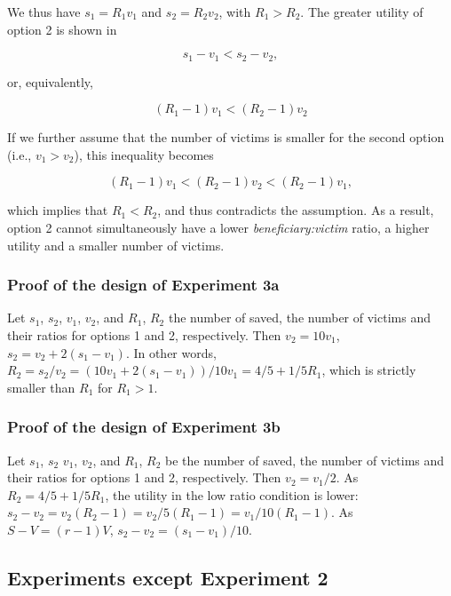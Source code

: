 \documentclass[
]{article}
\begin{document}
We thus have \(s_1 = R_1 v_1\) and \(s_2 = R_2 v_2\), with \(R_1 > R_2\). The greater utility of option 2 is shown in

\[s_1 - v_1 < s_2 - v_2,\]

or, equivalently,

\[(R_1 - 1) v_1 < (R_2 - 1) v_2\]

If we further assume that the number of victims is smaller for the second option (i.e., \(v_1 > v_2\)), this inequality becomes

\[(R_1 - 1) v_1 < (R_2 - 1) v_2 < (R_2 -1) v_1,\]

which implies that \(R_1 < R_2\), and thus contradicts the assumption. As a result, option 2 cannot simultaneously have a lower \emph{beneficiary:victim} ratio, a higher utility and a smaller number of victims.

\subsubsection{Proof of the design of Experiment 3a}\label{proof-of-the-design-of-experiment-3a}

Let \(s_1\), \(s_2\), \(v_1\), \(v_2\), and \(R_1\), \(R_2\) the number of saved, the number of victims and their ratios for options 1 and 2, respectively. Then \(v_2 = 10 v_1\), \(s_2 = v_2 +  2 (s_1 - v_1)\). In other words, \(R_2  = s_2 / v_2 = (10v_1 + 2 (s_1 - v_1)) / 10 v_1 = 4/5 + 1/5 R_1\), which is strictly smaller than \(R_1\) for \(R_1 > 1\).

\subsubsection{Proof of the design of Experiment 3b}\label{proof-of-the-design-of-experiment-3b}

Let \(s_1\), \(s_2\) \(v_1\), \(v_2\), and \(R_1\), \(R_2\) be the number of saved, the number of victims and their ratios for options 1 and 2, respectively. Then \(v_2 = v_1/2\). As \(R_2 = 4/5 + 1/5 R_1\), the utility in the low ratio condition is lower: \(s_2 - v_2 = v_2 (R_2 - 1) = v_2/5 (R_1 - 1) = v_1/10 (R_1 - 1)\). As \(S - V = (r - 1) V\), \(s_2 - v_2 = (s_1 - v_1)/10\).

\clearpage

\subsection{Experiments except Experiment 2}\label{experiments-except-experiment-2}
\end{document}
